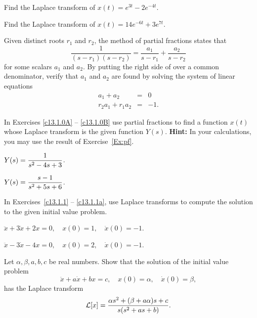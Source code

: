 \documentclass{ximera}
\begin{document}
\EXER

\TEXER

\begin{exercise} \label{c13.1.0a}
Find the Laplace transform of $x(t)=e^{3t}-2e^{-4t}$.
\end{exercise}

\begin{exercise} \label{c13.1.0b}
Find the Laplace transform of $x(t)=14e^{-6t}+3e^{7t}$.
\end{exercise}

\begin{exercise}  \label{Ex:pf}
Given distinct roots $r_1$ and $r_2$, the method of partial fractions states 
that 
\begin{equation} \label{E:pfquad}
\frac{1}{(s-r_1)(s-r_2)} = \frac{a_1}{s-r_1} + \frac{a_2}{s-r_2}
\end{equation}
for some scalars $a_1$ and $a_2$.  By putting the right side of 
over a common denominator, verify that $a_1$ and $a_2$ are found by solving 
the system of linear equations
\begin{eqnarray*}
a_1 + a_2 & = & 0\\
r_2a_1 + r_1a_2 & = & -1.
\end{eqnarray*}
\end{exercise}

\noindent In Exercises \ref{c13.1.0A} -- \ref{c13.1.0B} use partial fractions
to find a function $x(t)$ whose Laplace transform is the given function
$Y(s)$.  {\bf Hint:}  In your calculations, you may use the result of 
Exercise~\ref{Ex:pf}.
\begin{exercise} \label{c13.1.0A}
$Y(s) = \displaystyle\frac{1}{s^2-4s+3}$.
\end{exercise}
\begin{exercise} \label{c13.1.0B}
$Y(s) = \displaystyle\frac{s-1}{s^2+5s+6}$.
\end{exercise}


\noindent In Exercises~\ref{c13.1.1} -- \ref{c13.1.1a}, use Laplace transforms 
to compute the solution to the given initial value problem.
\begin{exercise} \label{c13.1.1}
$\ddot{x} + 3\dot{x} + 2x = 0, \quad x(0) = 1, \quad \dot{x}(0) = -1$. 
\end{exercise}
\begin{exercise} \label{c13.1.1a}
$\ddot{x} - 3\dot{x} - 4x = 0, \quad x(0) = 2, \quad \dot{x}(0) = -1$. 
\end{exercise}

\begin{exercise} \label{c13.4.4}
Let $\alpha,\beta,a,b,c$ be real numbers.  Show that the solution
of the initial value problem
\[
\ddot x +a\dot x +b x=c,\quad x(0)=\alpha,\quad \dot x(0)=\beta,
\]
has the Laplace transform
\[
{\cal L}[x] = \frac{\alpha s^2 +(\beta +a\alpha)s+c}{s(s^2+as+b)}.
\]
\end{exercise}
\end{document}
